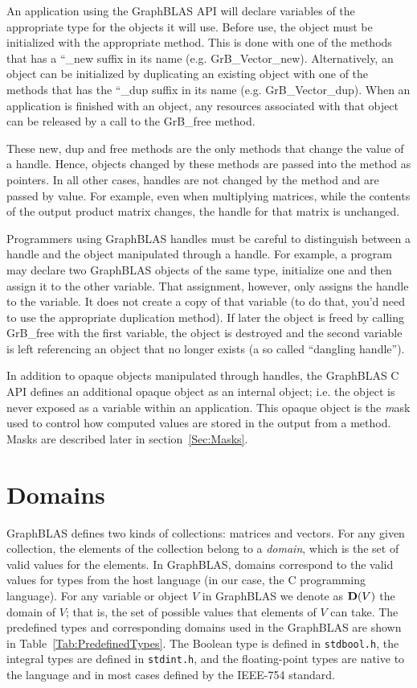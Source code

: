 An application using the GraphBLAS API will declare variables of the appropriate
type for the objects it will use.  Before use, the object must be initialized with 
the appropriate method.  This is done with one of the methods that has a ``{\sf \_new} suffix in its 
name (e.g. {\sf GrB\_Vector\_new}).  Alternatively, an object can be initialized by duplicating
an existing object with one of the methods that has the ``{\sf \_dup} suffix in its 
name  (e.g. {\sf GrB\_Vector\_dup}).   When an application is finished with 
an object, any resources associated with that object can be released by a
call to the {\sf GrB\_free} method.    

These {\sf new}, {\sf dup} and {\sf free} methods are the only methods that 
change the value of a handle.  Hence, objects changed by these methods are passed
into the method as pointers.  In all other cases, handles are not changed by the 
method and are passed by value.  For example, even when multiplying matrices, 
while the contents of the output product matrix changes, the handle for that matrix is unchanged. 

Programmers using GraphBLAS handles must be careful to distinguish between a handle and the 
object manipulated through a handle.  For example, a program may declare two 
GraphBLAS objects of the same type, initialize one and then assign it to the other
variable.  That assignment, however, only assigns the handle to the variable.  It does not 
create a copy of that variable (to do that, you'd need to use the appropriate duplication method).
If later the object is freed by calling {\sf GrB\_free} with the first variable, the object
is destroyed and the second variable is left referencing an object that no longer 
exists (a so called ``dangling handle'').

In addition to opaque objects manipulated through handles, the GraphBLAS C API defines
an additional opaque object as an internal object; i.e. the object is never exposed as
a variable within an application.  This opaque object is the {\emph mask} used to
control how computed values are stored in the output from a method.  Masks 
are described later in section~\ref{Sec:Masks}.

\section{Domains}

GraphBLAS defines two kinds of collections: matrices and vectors.
For any given collection, the elements of the collection belong to
a \emph{domain}, which is the set of valid values for the elements.
In GraphBLAS, domains correspond to the valid values for types from
the host language (in our case, the C programming language).  For any
variable or object $V$ in GraphBLAS we denote as $\bold{D}(V)$ the
domain of $V$; that is, the set of possible values that elements of
$V$ can take.  The predefined types and corresponding domains used in the 
GraphBLAS are shown in Table~\ref{Tab:PredefinedTypes}.  The Boolean
type is defined in {\tt stdbool.h}, the integral types are defined in
{\tt stdint.h}, and the floating-point types are native to the language
and in most cases defined by the IEEE-754 standard.


